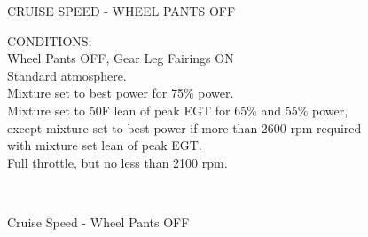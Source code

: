 \begin{figure}[t]
\begin{center}
\begin{perfhdr}CRUISE SPEED - WHEEL PANTS OFF\\
\end{perfhdr}

\begin{minipage}{5in}
  \begin{flushleft}
    CONDITIONS:\\
    Wheel Pants OFF, Gear Leg Fairings ON\\
    Standard atmosphere.\\
    Mixture set to best power for 75\% power.\\
    Mixture set to 50\textdegree F lean of peak EGT for 65\% and 55\% power, except mixture set to best power if more than 2600 rpm required with mixture set lean of peak EGT.\\
    Full throttle, but no less than 2100 rpm.\\
    \end{flushleft}
\end{minipage}\\
\vspace{5ex}

\end{center}  %
\caption{Cruise Speed - Wheel Pants OFF}
\label{Cruise-speed-WP-OFF}
\end{figure}


